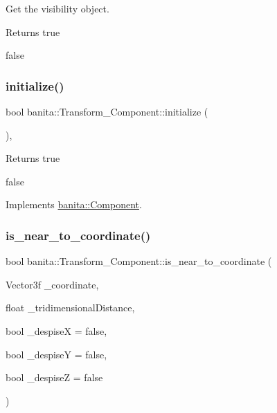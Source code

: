 Get the visibility object. 

\begin{DoxyReturn}{Returns}
true 

false 
\end{DoxyReturn}
\mbox{\label{classbanita_1_1_transform___component_af21e03166cba2a8489b2a5e02867ce6a}} 
\subsubsection{\texorpdfstring{initialize()}{initialize()}}
{\footnotesize\ttfamily bool banita\+::\+Transform\+\_\+\+Component\+::initialize (\begin{DoxyParamCaption}{ }\end{DoxyParamCaption})\hspace{0.3cm}{\ttfamily [override]}, {\ttfamily [virtual]}}

\begin{DoxyReturn}{Returns}
true 

false 
\end{DoxyReturn}


Implements \mbox{\hyperlink{classbanita_1_1_component_a2f700c071185f7033caa69576dafa9e7}{banita\+::\+Component}}.

\mbox{\label{classbanita_1_1_transform___component_a5299c227977c6efd87cc83af7c357a71}} 
\subsubsection{\texorpdfstring{is\_near\_to\_coordinate()}{is\_near\_to\_coordinate()}}
{\footnotesize\ttfamily bool banita\+::\+Transform\+\_\+\+Component\+::is\+\_\+near\+\_\+to\+\_\+coordinate (\begin{DoxyParamCaption}\item[{Vector3f}]{\+\_\+coordinate,  }\item[{float}]{\+\_\+tridimensional\+Distance,  }\item[{bool}]{\+\_\+despiseX = {\ttfamily false},  }\item[{bool}]{\+\_\+despiseY = {\ttfamily false},  }\item[{bool}]{\+\_\+despiseZ = {\ttfamily false} }\end{DoxyParamCaption})\hspace{0.3cm}{\ttfamily [inline]}}



